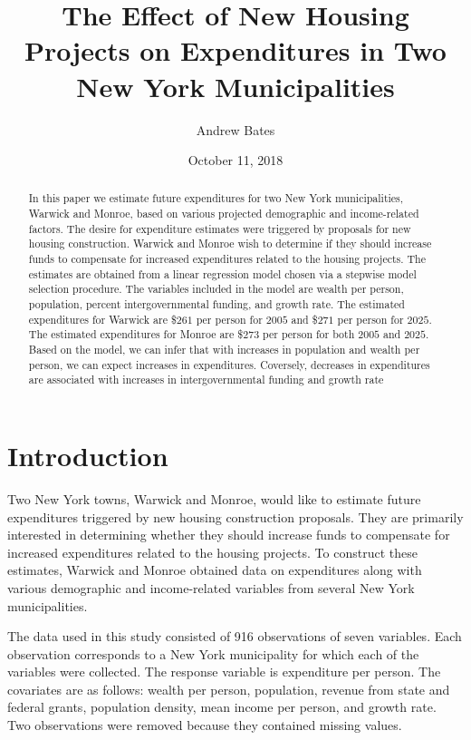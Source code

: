 \documentclass{article}\usepackage[]{graphicx}\usepackage[]{color}
\title{The Effect of New Housing Projects on Expenditures in Two New York Municipalities}
\author{Andrew Bates}
\date{October 11, 2018}
\begin{document}
 
\maketitle

\begin{abstract}
In this paper we estimate future expenditures for two New York municipalities, Warwick and Monroe, based on various projected demographic and income-related factors. The desire for expenditure estimates were triggered by proposals for new housing construction. Warwick and Monroe wish to determine if they should increase funds to compensate for increased expenditures related to the housing projects. The estimates are obtained from a linear regression model chosen via a stepwise model selection procedure. The variables included in the model are wealth per person, population, percent intergovernmental funding, and growth rate. The estimated expenditures for Warwick are \$$261$ per person for $2005$ and \$$271$ per person for $2025$. The estimated expenditures for Monroe are \$$273$ per person for both $2005$ and $2025$. Based on the model, we can infer that with increases in population and wealth per person, we can expect increases in expenditures. Coversely, decreases in expenditures are associated with increases in intergovernmental funding and growth rate
\end{abstract}


\section{Introduction} \label{intro}

Two New York towns, Warwick and Monroe, would like to estimate future expenditures triggered by new housing construction proposals. They are primarily interested in determining whether they should increase funds to compensate for increased expenditures related to the housing projects. To construct these estimates, Warwick and Monroe obtained data on expenditures along with various demographic and income-related variables from several New York municipalities. 


The data used in this study consisted of 916 observations of seven variables. Each observation corresponds to a New York municipality for which each of the variables were collected. The response variable is expenditure per person. The covariates are as follows: wealth per person, population, revenue from state and federal grants, population density, mean income per person, and growth rate. Two observations were removed because they contained missing values.
\end{document}
